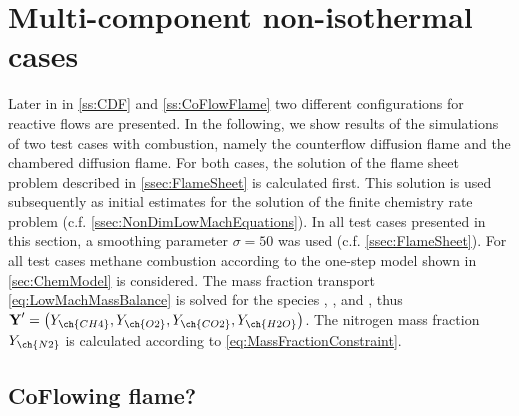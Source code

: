 \section{Multi-component non-isothermal cases}\label{sec:MultCompNonIsothermCase}
Later in in \cref{ss:CDF} and \cref{ss:CoFlowFlame} two different configurations for reactive flows are presented. 
In the following, we show results of the simulations of two test cases with combustion, namely the counterflow diffusion flame and the chambered diffusion flame. For both cases, the solution of the flame sheet problem described in \cref{ssec:FlameSheet} is calculated first. This solution is used subsequently as initial estimates for the solution of the finite chemistry rate problem (c.f. \cref{ssec:NonDimLowMachEquations}). In all test cases presented in this section, a smoothing parameter $\sigma = 50$ was used (c.f. \cref{ssec:FlameSheet}). For all test cases methane combustion according to the one-step model shown in \cref{sec:ChemModel} is considered. The mass fraction transport \cref{eq:LowMachMassBalance} is solved for the species , ,  and , thus $\vec{Y}' = \left(Y_{\ch{CH4}},Y_{\ch{O2}},Y_{\ch{CO2}},Y_{\ch{H2O}}\right)$. The nitrogen mass fraction $Y_{\ch{N2}}$ is calculated according to \cref{eq:MassFractionConstraint}. 



\subsection{CoFlowing flame?}

